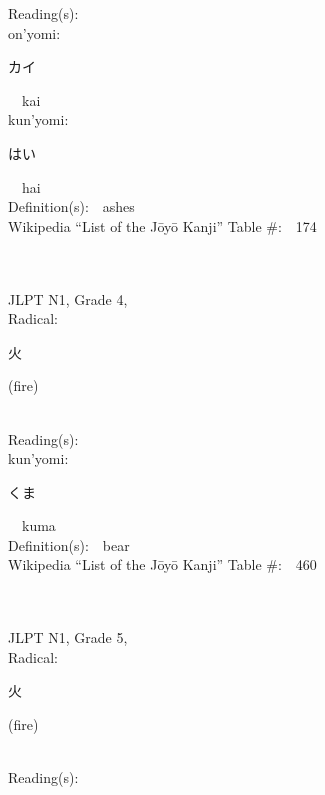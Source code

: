 \begin{multicols}{2}
Reading(s):\ \ \\
{\hspace*{1em}}on'yomi:\ \ \\
{\hspace*{2em}}{\begin{CJK}{UTF8}{min} カイ \end{CJK}}\ \ kai\ \ \\
{\hspace*{1em}}kun'yomi:\ \ \\
{\hspace*{2em}}{\begin{CJK}{UTF8}{min} はい \end{CJK}}\ \ hai\ \ \\
Definition(s):\ \ ashes \\
Wikipedia ``List of the J\=oy\=o Kanji'' Table \#:\ \ 174 \\
\ \ \\
{\fontsize{34pt}{40pt}  }\ \ \\  %
{JLPT N1, Grade 4, \\Radical:\ \ {\begin{CJK}{UTF8}{min} 火 \end{CJK}} (fire) } \\
Reading(s):\ \ \\
{\hspace*{1em}}kun'yomi:\ \ \\
{\hspace*{2em}}{\begin{CJK}{UTF8}{min} くま \end{CJK}}\ \ kuma\ \ \\
Definition(s):\ \ bear \\
Wikipedia ``List of the J\=oy\=o Kanji'' Table \#:\ \ 460 \\
\ \ \\
{\fontsize{34pt}{40pt}  }\ \ \\  %
{JLPT N1, Grade 5, \\Radical:\ \ {\begin{CJK}{UTF8}{min} 火 \end{CJK}} (fire) } \\
Reading(s):\ \ \\

\end{multicols}
